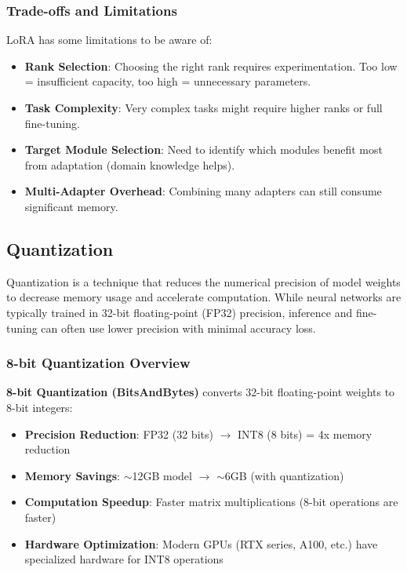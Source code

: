 \documentclass[conference]{IEEEtran}
\begin{document}
\subsubsection{Trade-offs and Limitations}

LoRA has some limitations to be aware of:

\begin{itemize}
    \item \textbf{Rank Selection}: Choosing the right rank requires experimentation. Too low = insufficient capacity, too high = unnecessary parameters.
    
    \item \textbf{Task Complexity}: Very complex tasks might require higher ranks or full fine-tuning.
    
    \item \textbf{Target Module Selection}: Need to identify which modules benefit most from adaptation (domain knowledge helps).
    
    \item \textbf{Multi-Adapter Overhead}: Combining many adapters can still consume significant memory.
\end{itemize}

\subsection{Quantization}

Quantization is a technique that reduces the numerical precision of model weights to decrease memory usage and accelerate computation. While neural networks are typically trained in 32-bit floating-point (FP32) precision, inference and fine-tuning can often use lower precision with minimal accuracy loss.

\subsubsection{8-bit Quantization Overview}

\textbf{8-bit Quantization (BitsAndBytes)} converts 32-bit floating-point weights to 8-bit integers:

\begin{itemize}
    \item \textbf{Precision Reduction}: FP32 (32 bits) $\rightarrow$ INT8 (8 bits) = 4x memory reduction
    \item \textbf{Memory Savings}: $\sim$12GB model $\rightarrow$ $\sim$6GB (with quantization)
    \item \textbf{Computation Speedup}: Faster matrix multiplications (8-bit operations are faster)
    \item \textbf{Hardware Optimization}: Modern GPUs (RTX series, A100, etc.) have specialized hardware for INT8 operations
\end{itemize}
\end{document}
